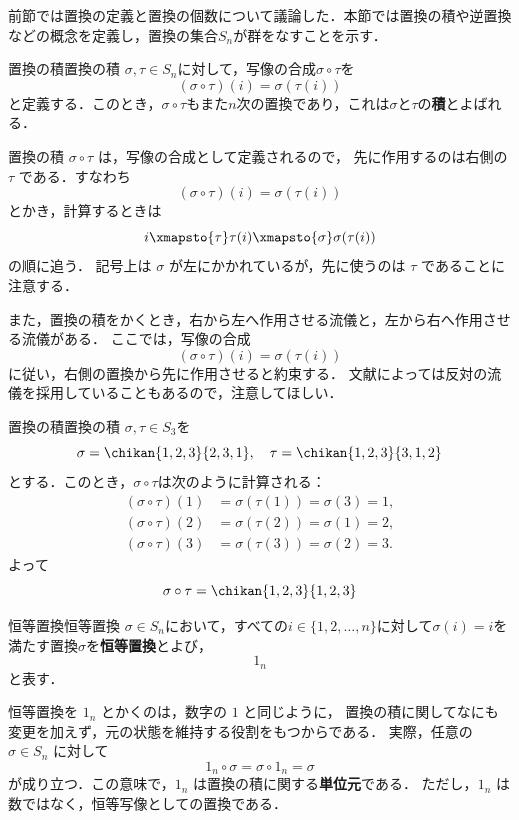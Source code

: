 前節では置換の定義と置換の個数について議論した．本節では置換の積や逆置換などの概念を定義し，置換の集合$S_n$が群をなすことを示す．

\begin{definition}{置換の積}{置換の積}
  $\sigma, \tau \in S_n$に対して，写像の合成$\sigma \circ \tau$を
  \[
  (\sigma \circ \tau)(i) = \sigma(\tau(i))
  \]
  と定義する．このとき，$\sigma \circ \tau$もまた$n$次の置換であり，これは$\sigma$と$\tau$の\textbf{積}とよばれる．
\end{definition}

置換の積 $\sigma \circ \tau$ は，写像の合成として定義されるので，
先に作用するのは右側の $\tau$ である．すなわち
\[
(\sigma\circ\tau)(i)=\sigma(\tau(i))
\]
とかき，計算するときは
\[
i \xmapsto{\tau} \tau(i) \xmapsto{\sigma} \sigma(\tau(i))
\]
の順に追う．
記号上は $\sigma$ が左にかかれているが，先に使うのは $\tau$ であることに注意する．


また，置換の積をかくとき，右から左へ作用させる流儀と，左から右へ作用させる流儀がある．
ここでは，写像の合成
\[
(\sigma\circ\tau)(i)=\sigma(\tau(i))
\]
に従い，右側の置換から先に作用させると約束する．
文献によっては反対の流儀を採用していることもあるので，注意してほしい．

\begin{example}{置換の積}{置換の積}
  $\sigma, \tau \in S_3$を
  \[
  \sigma = \chikan{1, 2, 3}{2, 3, 1}, \quad
  \tau = \chikan{1, 2, 3}{3, 1, 2}
  \]
  とする．このとき，$\sigma \circ \tau$は次のように計算される：
  \begin{align*}
    (\sigma \circ \tau)(1) &= \sigma(\tau(1)) = \sigma(3) = 1, \\
    (\sigma \circ \tau)(2) &= \sigma(\tau(2)) = \sigma(1) = 2, \\
    (\sigma \circ \tau)(3) &= \sigma(\tau(3)) = \sigma(2) = 3.
  \end{align*}
  よって
  \[
  \sigma \circ \tau = \chikan{1, 2, 3}{1, 2, 3}
  \]
\end{example}



\begin{definition}{恒等置換}{恒等置換}
  $\sigma\in S_n$において，すべての$i \in \{1, 2, \dots, n\}$に対して$\sigma(i) = i$を満たす置換$\sigma$を\textbf{恒等置換}とよび，
  \[
  1_n
  \]
  と表す．
\end{definition}


恒等置換を $1_n$ とかくのは，数字の $1$ と同じように，
置換の積に関してなにも変更を加えず，元の状態を維持する役割をもつからである．
実際，任意の $\sigma\in S_n$ に対して
\[
1_n\circ\sigma=\sigma\circ 1_n=\sigma
\]
が成り立つ．この意味で，$1_n$ は置換の積に関する\textbf{単位元}である．
ただし，$1_n$ は数ではなく，恒等写像としての置換である．


